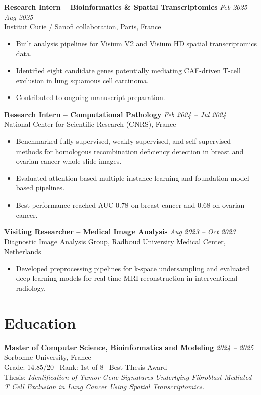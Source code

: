 \documentclass[10pt,a4paper]{article}
\begin{document}
\textbf{Research Intern -- Bioinformatics \& Spatial Transcriptomics} \hfill \textit{Feb 2025 -- Aug 2025}\\
Institut Curie / Sanofi collaboration, Paris, France
\begin{itemize}
  \item Built analysis pipelines for Visium V2 and Visium HD spatial transcriptomics data.
  \item Identified eight candidate genes potentially mediating CAF-driven T-cell exclusion in lung squamous cell carcinoma.
  \item Contributed to ongoing manuscript preparation.
\end{itemize}

\textbf{Research Intern -- Computational Pathology} \hfill \textit{Feb 2024 -- Jul 2024}\\
National Center for Scientific Research (CNRS), France
\begin{itemize}
  \item Benchmarked fully supervised, weakly supervised, and self-supervised methods for homologous recombination deficiency detection in breast and ovarian cancer whole-slide images.
  \item Evaluated attention-based multiple instance learning and foundation-model-based pipelines.
  \item Best performance reached AUC 0.78 on breast cancer and 0.68 on ovarian cancer.
\end{itemize}

\textbf{Visiting Researcher -- Medical Image Analysis} \hfill \textit{Aug 2023 -- Oct 2023}\\
Diagnostic Image Analysis Group, Radboud University Medical Center, Netherlands
\begin{itemize}
  \item Developed preprocessing pipelines for k-space undersampling and evaluated deep learning models for real-time MRI reconstruction in interventional radiology.
\end{itemize}

\section*{Education}
\textbf{Master of Computer Science, Bioinformatics and Modeling} \hfill \textit{2024 -- 2025}\\
Sorbonne University, France\\
Grade: 14.85/20 \textbar\ Rank: 1st of 8 \textbar\ Best Thesis Award\\
Thesis: \textit{Identification of Tumor Gene Signatures Underlying Fibroblast-Mediated T Cell Exclusion in Lung Cancer Using Spatial Transcriptomics.}
\end{document}
